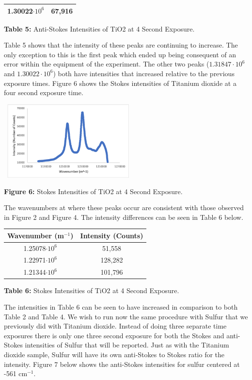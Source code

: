 \documentclass[12pt]{article}
\begin{document}
\begin{multicols}{2}
\begin{tabular}{|c|c|}
    1.30022$\cdot10^6$ & 67,916 \\ \hline
\end{tabular}
\centerline{\tiny\textbf{{Table 5:}} \tiny{Anti-Stokes Intensities of TiO2 at 4 Second Exposure.}}
\newline
Table 5 shows that the intensity of these peaks are continuing to increase. The only exception to this is the first peak which ended up being consequent of an error within the equipment of the experiment. The other two peaks ($1.31847\cdot10^6$ and $1.30022\cdot10^6$) both have intensities that increased relative to the previous exposure times. Figure 6 shows the Stokes intensities of Titanium dioxide at a four second exposure time.
\begin{center}
    \includegraphics[width=7cm, height=4cm]{PHYS 331 RS TiO2 Stokes Wavnumber (4 Sec).png}
    \caption{\textbf{\small{Figure 6:}} \small{Stokes Intensities of TiO2 at 4 Second Exposure.}}
\end{center}
The wavenumbers at where these peaks occur are consistent with those observed in Figure 2 and Figure 4. The intensity differences can be seen in Table 6 below.
\newline
\begin{tabular}{|c|c|}
    \hline \textbf{Wavenumber (m$^{-1}$)} & \textbf{Intensity (Counts)} \\ \hline
    1.25078$\cdot10^6$ & 51,558 \\ \hline
    1.22971$\cdot10^6$ & 128,282 \\ \hline
    1.21344$\cdot10^6$ & 101,796 \\ \hline
\end{tabular}
\centerline{\tiny\textbf{{Table 6:}} \tiny{Stokes Intensities of TiO2 at 4 Second Exposure.}}
\newline
The intensities in Table 6 can be seen to have increased in comparison to both Table 2 and Table 4. We wish to run now the same procedure with Sulfur that we previously did with Titanium dioxide. Instead of doing three separate time exposures there is only one three second exposure for both the Stokes and anti-Stokes intensities of Sulfur that will be reported. Just as with the Titanium dioxide sample, Sulfur will have its own anti-Stokes to Stokes ratio for the intensity. Figure 7 below shows the anti-Stokes intensities for sulfur centered at -561 cm$^{-1}$.

\end{multicols}
\end{document}
